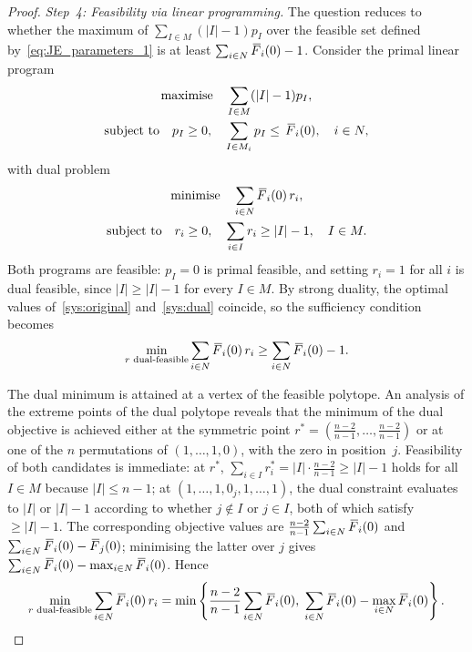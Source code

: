 \documentclass[letterpaper,12pt]{article}
\numberwithin{equation}{section}
\newcommand{\N}{{N}}
\newcommand{\M}{{M}}
\newcommand{\I}{{I}}
\newcommand{\F}{\,\overline{\kern-0.175em F\kern-0em}}
\begin{document}
{\begin{proof}
\smallskip
\noindent\textit{Step~4: Feasibility via linear programming.}
The question reduces to whether the maximum of $\sum_{\I\in\M}(|\I|-1)p_\I$
over the feasible set defined by~\eqref{eq:JE_parameters_1} is at least
$\sum_{i\in\N}\F_i(0)-1$. Consider the primal linear program
\begin{gather}
\label{sys:original}
\text{maximise}\quad\sum_{\I\in\M}(|\I|-1)p_{\I}, \\
\nonumber
\text{subject to}\quad p_{\I}\ge 0,\quad
\sum_{\I\in \M_i}p_{\I}\le\, \F_i(0),\quad i\in\N,
\end{gather}
with dual problem
\begin{gather}
\label{sys:dual}
\text{minimise}\quad\sum_{i\in\N}\F_i(0)\,r_i, \\
\nonumber
\text{subject to}\quad r_i\ge 0,\quad
\sum_{i\in \I}r_i\ge |\I|-1,\quad \I\in\M.
\end{gather}
Both programs are feasible: $p_\I=0$ is primal feasible, and setting $r_i=1$
for all $i$ is dual feasible, since $|\I|\ge|\I|-1$ for every $\I\in\M$. By
strong duality, the optimal values of~\eqref{sys:original} and~\eqref{sys:dual}
coincide, so the sufficiency condition becomes
\[
\min_{r\text{ dual-feasible}}\sum_{i\in\N}\F_i(0)\,r_i\ge\sum_{i\in\N}\F_i(0)-1.
\]

The dual minimum is attained at a vertex of the feasible polytope. An analysis
of the extreme points of the dual polytope reveals that the minimum of the dual
objective is achieved either at the symmetric point
$r^*=\left(\frac{n-2}{n-1},\dots,\frac{n-2}{n-1}\right)$
or at one of the $n$ permutations of $(1,\dots,1,0)$, with the zero in
position~$j$. Feasibility of both candidates is immediate: at $r^*$,
$\sum_{i\in\I}r_i^*=|\I|\cdot\frac{n-2}{n-1}\ge|\I|-1$ holds for all
$\I\in\M$ because $|\I|\le n-1$; at $(1,\dots,1,0_j,1,\dots,1)$,
the dual constraint evaluates to $|\I|$ or $|\I|-1$ according to whether
$j\notin\I$ or $j\in\I$, both of which satisfy $\ge|\I|-1$. The corresponding
objective values are $\frac{n-2}{n-1}\sum_{i\in\N}\F_i(0)$ and
$\sum_{i\in\N}\F_i(0)-\F_j(0)$; minimising the latter over $j$ gives
$\sum_{i\in\N}\F_i(0)-\max_{i\in\N}\F_i(0)$. Hence
\begin{equation}
\label{eq:JE_minimum_sol}
\min_{r\text{ dual-feasible}}\sum_{i\in\N}\F_i(0)\,r_i
=\min\left\{\frac{n-2}{n-1}\sum_{i\in\N}\F_i(0),\;
\sum_{i\in\N}\F_i(0)-\max_{i\in\N}\F_i(0)\right\}.
\end{equation}


\end{proof}}
\end{document}

